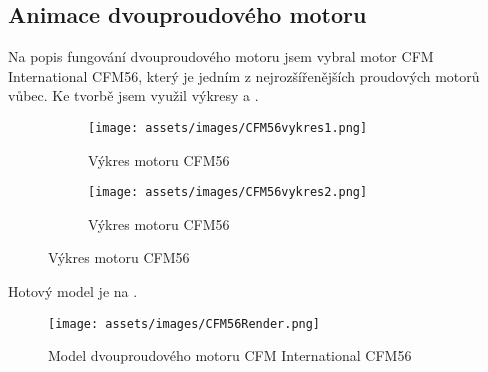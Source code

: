 \subsection{Animace dvouproudového motoru}
{Na popis fungování dvouproudového motoru jsem vybral motor CFM International CFM56, který je jedním z nejrozšířenějších proudových motorů vůbec. Ke tvorbě jsem využil výkresy  a .}
\begin{figure}[H]
    \centering
    \begingroup
    \makeatletter
    \renewcommand\thesubfigure{\thefigure~--~\@nameuse{subfiglabel@\alph{subfigure}}}
    \newcommand{\subfiglabel@a}{vlevo}
    \newcommand{\subfiglabel@b}{vpravo}
    \captionsetup[subfigure]{labelformat=simple, labelsep=colon}
    \renewcommand\p@subfigure{}
    \makeatother
    \begin{subfigure}{.42\textwidth}
        \centering
        \texttt{[image: assets/images/CFM56vykres1.png]}
        \caption{Výkres motoru CFM56 \cite{RG:ReducedOrderModel}}
        \label{obr:CFM56vykres1}
    \end{subfigure}\hfill
    \begin{subfigure}{.55\textwidth}
        \centering
        \texttt{[image: assets/images/CFM56vykres2.png]}
        \caption{Výkres motoru CFM56 \cite[upraveno]{TL:OffDesignPerformancePrediction}}
        \label{obr:CFM56vykres2}
    \end{subfigure}
    \endgroup
\end{figure}
{Hotový model je na .}
\begin{figure}[H]
    \centering
    \texttt{[image: assets/images/CFM56Render.png]}
    \caption{Model dvouproudového motoru CFM International CFM56 \jaObr}
    \label{obr:CFM56Render}
\end{figure}
